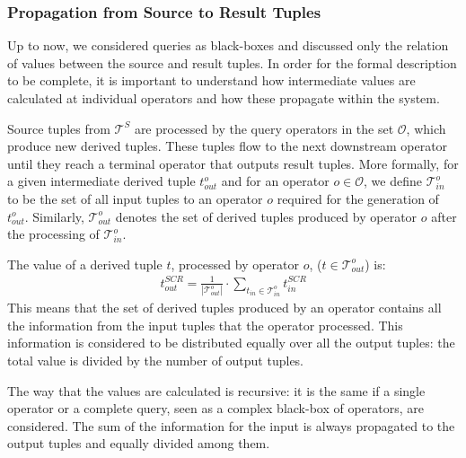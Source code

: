 \subsubsection*{\sic Propagation from Source to Result Tuples}
\vspace{-5pt}
Up to now, we considered queries as black-boxes and discussed only the relation of \sic values between
the source and result tuples. In order for the formal description to be complete, it is important to
understand how intermediate \sic values are calculated at individual operators and how these propagate
within the system.

Source tuples from $\mathcal{T}^{S}$ are processed by the query operators in the set $\mathcal{O}$, which
produce new derived tuples. These tuples flow to the next downstream operator until they reach a terminal
operator that outputs result tuples.
More formally, for a given intermediate derived tuple $t_{out}^{o}$ and for an operator $o \in
\mathcal{O}$, we define $\mathcal{T}_{in}^{o}$ to be the set of all input tuples to an operator $o$ required for the
generation of $t_{out}^o$.
Similarly, $\mathcal{T}_{out}^{o}$ denotes the set of derived tuples produced by operator $o$ after the
processing of $\mathcal{T}_{in}^{o}$.

The \sic value of a derived tuple $t$, processed by operator $o$, (\ie $t \in \mathcal{T}_{out}^{o}$) is:
\begin{align} 
	t^{SCR}_{out} = \frac{1}{|\mathcal{T}_{out}^{o}|} \cdot \displaystyle\sum_{t_{in} \in
	\mathcal{T}_{in}^{o}}{t^{SCR}_{in}}
\end{align}
This means that the set of derived tuples produced by an operator contains all the information from the
input tuples that the operator processed. This information is considered to be distributed equally over
all the output tuples: the total value is divided by the number of output tuples.

The way that the \sic values are calculated is recursive: it is the same if a
single operator or a complete query, seen as a complex black-box of operators, are considered. The sum of
the information for the input is always propagated to the output tuples and equally divided among them. 
\vspace{-10pt}
